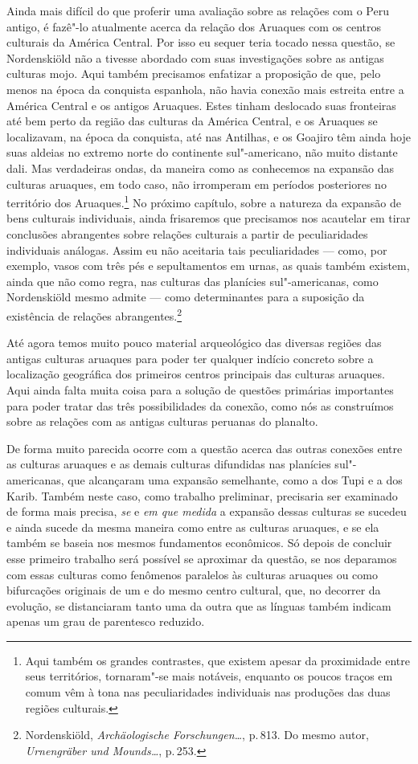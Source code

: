 Ainda mais difícil do que proferir uma avaliação sobre as relações com o
Peru antigo, é fazê"-lo atualmente acerca da relação dos Aruaques com os
centros culturais da América Central. Por isso eu sequer teria tocado
nessa questão, se Nordenskiöld não a tivesse abordado com suas
investigações sobre as antigas culturas mojo. Aqui também precisamos
enfatizar a proposição de que, pelo menos na época da
conquista espanhola, não havia conexão mais estreita entre a América
Central e os antigos Aruaques. Estes tinham deslocado suas fronteiras até
bem perto da região das culturas da América Central, e os Aruaques se
localizavam, na época da conquista, até nas Antilhas, e os Goajiro têm
ainda hoje suas aldeias no extremo norte do continente sul"-americano,
não muito distante dali. Mas verdadeiras ondas, da maneira como as
conhecemos na expansão das culturas aruaques, em todo caso, não
irromperam em períodos posteriores no território dos Aruaques.\footnote{Aqui
também os grandes contrastes, que existem apesar da proximidade entre
seus territórios, tornaram"-se mais notáveis, enquanto os poucos traços
em comum vêm à tona nas peculiaridades individuais nas produções das
duas regiões culturais.} No próximo capítulo, sobre a natureza da
expansão de bens culturais individuais, ainda frisaremos que precisamos
nos acautelar em tirar conclusões abrangentes sobre relações culturais a
partir de peculiaridades individuais análogas. Assim eu não aceitaria
tais peculiaridades --- como, por exemplo, vasos com três pés e
sepultamentos em urnas, as quais também existem, ainda que não como
regra, nas culturas das planícies sul"-americanas, como Nordenskiöld
mesmo admite --- como determinantes para a suposição da existência de
relações abrangentes.\footnote{Nordenskiöld, \textit{Archäologische Forschungen\ldots}, p.\,813. Do mesmo autor,
  \textit{Urnengräber und Mounds\ldots}, p.\,253.}

Até agora temos muito pouco material arqueológico das diversas regiões
das antigas culturas aruaques para poder ter qualquer indício concreto
sobre a localização geográfica dos primeiros centros principais das
culturas aruaques. Aqui ainda falta muita coisa para a solução de
questões primárias importantes para poder tratar das três
possibilidades da conexão, como nós as construímos sobre as relações com
as antigas culturas peruanas do planalto.

De forma muito parecida ocorre com a questão acerca das outras conexões
entre as culturas aruaques e as demais culturas difundidas nas planícies
sul"-americanas, que alcançaram uma expansão semelhante, como a dos Tupi
e a dos Karib. Também neste caso, como trabalho preliminar, precisaria
ser examinado de forma mais precisa, \textit{se} e \textit{em que medida} a
expansão dessas culturas se sucedeu e ainda sucede da mesma maneira
como entre as culturas aruaques, e se ela também se baseia nos mesmos
fundamentos econômicos. Só depois de concluir esse primeiro trabalho 
será possível se aproximar da questão, se nos deparamos com essas
culturas como fenômenos paralelos às culturas aruaques ou como
bifurcações originais de um e do mesmo centro cultural, que, no decorrer
da evolução, se distanciaram tanto uma da outra que as línguas também
indicam apenas um grau de parentesco reduzido.

